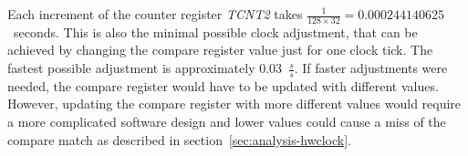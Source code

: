 Each increment of the counter register {\it{TCNT2}} takes
$\frac{1}{128 \times 32} = 0.000244140625$~seconds.
This is also the minimal possible clock adjustment,
that can be achieved by changing the compare register value just for one clock tick.
The fastest possible adjustment is approximately 0.03~$\frac{s}{s}$.
If faster adjustments were needed, the compare register would have to be updated with different values. 
However, updating the compare register with more different values would require
a more complicated software design
and lower values could cause a miss of the compare match as described in section~\ref{sec:analysis-hwclock}.
